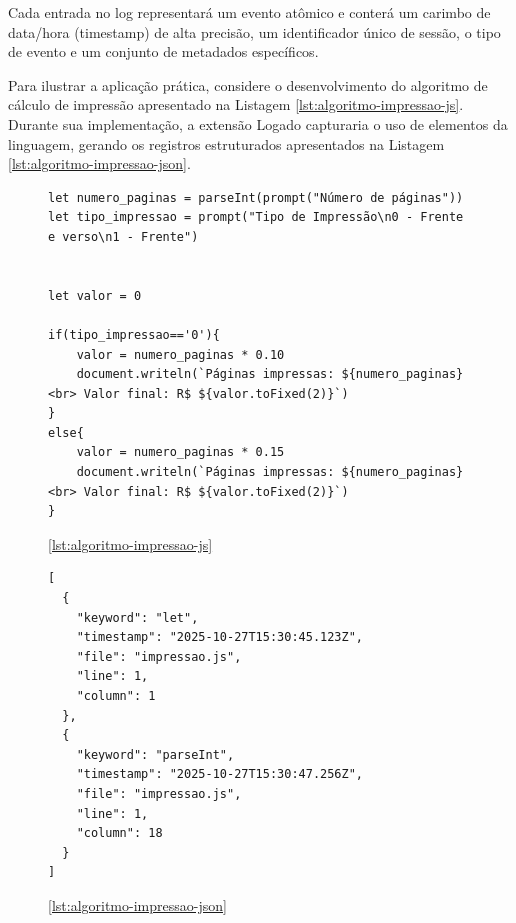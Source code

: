 Cada entrada no log representará um evento atômico e conterá um carimbo de data/hora (timestamp) de alta precisão, um identificador único de sessão, o tipo de evento e um conjunto de metadados específicos. 

Para ilustrar a aplicação prática, considere o desenvolvimento do algoritmo de cálculo de impressão apresentado na Listagem \ref{lst:algoritmo-impressao-js}. Durante sua implementação, a extensão Logado capturaria o uso de elementos da linguagem, gerando os registros estruturados apresentados na Listagem \ref{lst:algoritmo-impressao-json}.

\begin{figure}[h!]
 \centering
    \begin{lstlisting}[style=jsonstyle, caption={Algoritmo de cálculo de impressão - exemplo didático que simula o desenvolvimento típico de um estudante iniciante}, label={lst:algoritmo-impressao-js}]
let numero_paginas = parseInt(prompt("Número de páginas"))
let tipo_impressao = prompt("Tipo de Impressão\n0 - Frente e verso\n1 - Frente")


let valor = 0

if(tipo_impressao=='0'){
    valor = numero_paginas * 0.10
    document.writeln(`Páginas impressas: ${numero_paginas}<br> Valor final: R$ ${valor.toFixed(2)}`)
}
else{
    valor = numero_paginas * 0.15
    document.writeln(`Páginas impressas: ${numero_paginas}<br> Valor final: R$ ${valor.toFixed(2)}`)
}
    \end{lstlisting}
\ref{lst:algoritmo-impressao-js}
\end{figure}


\begin{figure}[h!]
    \centering
    \begin{lstlisting}[style=jsonstyle, caption={Exemplo de saída da extensão Logado capturando palavras-chave durante o desenvolvimento do algoritmo de cálculo de impressão}, label={lst:algoritmo-impressao-json}, firstnumber=1]
[
  {
    "keyword": "let",
    "timestamp": "2025-10-27T15:30:45.123Z",
    "file": "impressao.js",
    "line": 1,
    "column": 1
  },
  {
    "keyword": "parseInt", 
    "timestamp": "2025-10-27T15:30:47.256Z",
    "file": "impressao.js",
    "line": 1, 
    "column": 18
  }
]
    \end{lstlisting}
    \ref{lst:algoritmo-impressao-json}
\end{figure}


